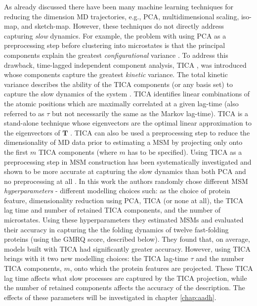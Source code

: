 As already discussed there have been many  machine learning techniques for reducing the dimension MD trajectories, e.g., PCA, multidimensional scaling, iso-map, and sketch-map. However,  these techniques do not directly address capturing \emph{slow} dynamics. For example, the problem with using PCA as a preprocessing step before clustering into microstates is that the principal components explain the greatest \emph{configurational} variance \cite{perez-hernandezIdentificationSlowMolecular2013a}. To address this drawback, time-lagged independent component analysis, TICA \cite{perez-hernandezIdentificationSlowMolecular2013a, schwantesImprovementsMarkovState2013}, was introduced whose components capture the greatest \emph{kinetic} variance. The total kinetic variance describes the ability of the TICA components (or any basis set) to capture the slow dynamics of the system \cite{noeKineticDistanceKinetic2015}.  TICA identifies linear combinations of the atomic positions which are maximally correlated at a given lag-time (also referred to as $\tau$ but not necessarily the same as the Markov lag-time). TICA is a stand-alone technique whose eigenvectors are the optimal linear approximation to the eigenvectors of $\mathbf{T}$ \cite{nuskeVariationalApproachMolecular2014}.  TICA can also be used a preprocessing step to reduce the dimensionality of MD data prior to estimating a MSM by projecting only onto the first $m$ TICA components (where $m$ has to be specified).  Using TICA as a preprocessing step in MSM construction has been systematically investigated and shown to be more accurate at capturing the slow dynamics than both PCA and no preprocessing at all \cite{husicOptimizedParameterSelection2016}. In this work the authors randomly chose different MSM \emph{hyperparameters} - different modelling choices such: as the choice of protein feature, dimensionality reduction using PCA, TICA (or none at all), the TICA lag time and number of retained TICA components, and the number of microstates. Using these hyperparameters they estimated MSMs and evaluated their accuracy in capturing the the folding dynamics of twelve fast-folding proteins \cite{lindorff-larsenHowFastFoldingProteins2011a} (using the GMRQ score, described below).  They found that, on average,  models built with TICA had significantly  greater accuracy. However, using TICA  brings with it two new modelling choices: the TICA lag-time $\tau$ and the number TICA components, $m$, onto which the protein features are projected. These TICA lag time affects what slow processes are captured by the TICA projection, while the number of retained components affects the accuracy of the description.  The effects of these parameters will be investigated in chapter \ref{chap:aadh}. 


